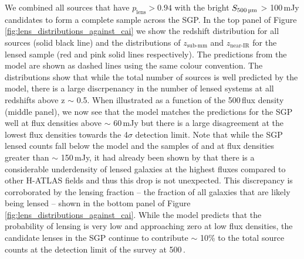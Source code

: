 We combined all sources that have $p_{\textrm{lens}} > 0.94$ with the bright $S_{\textrm{500\,\micron}}$ > 100\,mJy candidates to form a complete sample across the SGP. In the top panel of Figure \ref{fig:lens_distributions_against_cai} we show the redshift distribution for all sources (solid black line) and the distributions of $z_{\textrm{sub-mm}}$ and $z_{\textrm{near-IR}}$ for the lensed sample (red and pink solid lines respectively). The predictions from the \citealt{Cai_2013} model are shown as dashed lines using the same colour convention. The distributions show that while the total number of sources is well predicted by the model, there is a large discrpenancy in the number of lensed systems at all redshifts above z $\sim$ 0.5. When illustrated as a function of the 500\,\micron flux density (middle panel), we now see that the \citealt{Cai_2013} model matches the predictions for the SGP well at flux densities above $\sim$ 60\,mJy but there is a large disagreement at the lowest flux densities towards the 4$\sigma$ detection limit. Note that while the SGP lensed counts fall below the model and the samples of \citealt{Negrello_2017} and \citealt{Nayyeri_2016} at flux densities greater than $\sim$ 150\,mJy, it had already been shown by \citealt{Negrello_2017} that there is a considerable underdensity of lensed galaxies at the highest fluxes compared to other H-ATLAS fields and thus this drop is not unexpected. This discrepancy is corroborated by the lensing fraction -- the fraction of all galaxies that are likely being lensed -- shown in the bottom panel of Figure \ref{fig:lens_distributions_against_cai}. While the model predicts that the probability of lensing is very low and approaching zero at low flux densities, the candidate lenses in the SGP continue to contribute $\sim$ 10\% to the total source counts at the detection limit of the survey at 500\,\micron.

